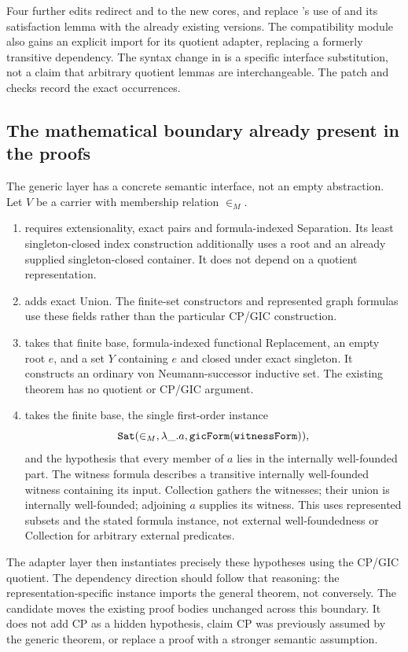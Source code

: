 Four further edits redirect  and  to the new cores, and replace 's use of  and its satisfaction lemma with the already existing  versions. The compatibility module  also gains an explicit  import for its quotient adapter, replacing a formerly transitive dependency. The syntax change in  is a specific interface substitution, not a claim that arbitrary quotient lemmas are interchangeable. The patch and checks record the exact occurrences.

\subsection{The mathematical boundary already present in the proofs}
The generic layer has a concrete semantic interface, not an empty abstraction. Let $V$ be a carrier with membership relation $\in_M$.
\begin{enumerate}
\item {} requires extensionality, exact pairs and formula-indexed Separation. Its least singleton-closed index construction additionally uses a root and an already supplied singleton-closed container. It does not depend on a quotient representation.
\item {} adds exact Union. The finite-set constructors and represented graph formulas use these fields rather than the particular CP/GIC construction.
\item {} takes that finite base, formula-indexed functional Replacement, an empty root $e$, and a set $Y$ containing $e$ and closed under exact singleton. It constructs an ordinary von Neumann-successor inductive set. The existing theorem has no quotient or CP/GIC argument.
\item {} takes the finite base, the single first-order instance
\[
  \code{Sat}(\in_M,\lambda\_ .a,
  \code{gicForm}(\code{witnessForm})),
\]
and the hypothesis that every member of $a$ lies in the internally well-founded part. The witness formula describes a transitive internally well-founded witness containing its input. Collection gathers the witnesses; their union is internally well-founded; adjoining $a$ supplies its witness. This uses represented subsets and the stated formula instance, not external well-foundedness or Collection for arbitrary external predicates.
\end{enumerate}
The adapter layer then instantiates precisely these hypotheses using the CP/GIC quotient. The dependency direction should follow that reasoning: the representation-specific instance imports the general theorem, not conversely. The candidate moves the existing proof bodies unchanged across this boundary. It does not add CP as a hidden hypothesis, claim CP was previously assumed by the generic theorem, or replace a proof with a stronger semantic assumption.

